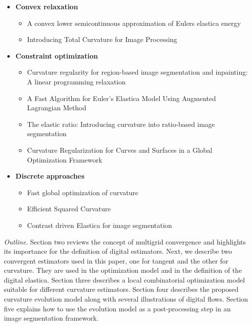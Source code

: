 \documentclass[runningheads]{llncs}
\begin{document}
\begin{itemize}
\item{\textbf{Convex relaxation}}
  \begin{itemize}
  \item{A convex lower semicontinuous approximation of Eulers elastica energy \cite{bredies15convex}}				\item{Introducing Total Curvature for Image Processing \cite{goldluecke11totalcurvature}}
  \end{itemize}	
  
\item{\textbf{Constraint optimization}}
  \begin{itemize}
  \item{Curvature regularity for region-based image segmentation and inpainting: A linear programming relaxation \cite{schoenemann09linear} }	
  \item{A Fast Algorithm for Euler's Elastica Model Using Augmented Lagrangian Method \cite{tai11elastica} }		
  \item{The elastic ratio: Introducing curvature into ratio-based image segmentation \cite{schoenemann2011elastic} }		
  \item{Curvature Regularization for Curves and Surfaces in a Global Optimization Framework \cite{strandmark11globalframework} }
  \end{itemize}
  
\item{\textbf{Discrete approaches}}
  \begin{itemize}
  \item{Fast global optimization of curvature \cite{zehiry10fast}	}
  \item{Efficient Squared Curvature \cite{nieuwenhuis14efficient} 	}
  \item{Contrast driven {E}lastica for image segmentation \cite{el2016contrast} }	
  \end{itemize}
  
	
\end{itemize}


\textit{Outline}. Section two reviews the concept of multigrid
convergence and highlights its importance for the definition of
digital estimators. Next, we describe two convergent estimators used
in this paper, one for tangent and the other for curvature. They are
used in the optimization model and in the definition of the digital
elastica. Section three describes a local combinatorial optimization model
suitable for different curvature estimators. Section four describes the proposed 
curvature evolution model along with several illustrations of digital flows. Section five
explains how to use the evolution model as a post-processing step in
an image segmentation framework. 
\end{document}
